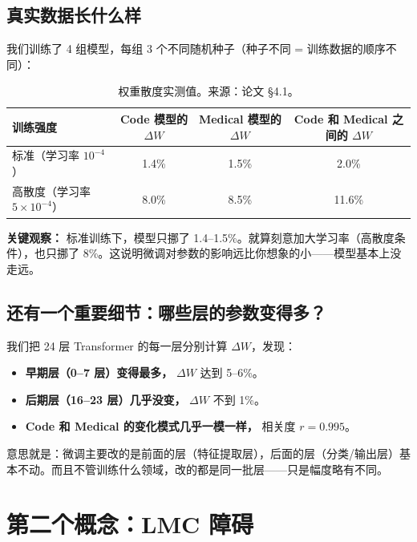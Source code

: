 \documentclass[12pt,a4paper]{ctexart}
\begin{document}
\subsection*{真实数据长什么样}

我们训练了 4 组模型，每组 3 个不同随机种子（种子不同 = 训练数据的顺序不同）：

\begin{table}[H]
\centering
\begin{tabular}{lccc}
\toprule
\textbf{训练强度} & \textbf{Code 模型的 $\Delta W$} & \textbf{Medical 模型的 $\Delta W$} & \textbf{Code 和 Medical 之间的 $\Delta W$} \\
\midrule
标准（学习率 $10^{-4}$） & 1.4\% & 1.5\% & 2.0\% \\
高散度（学习率 $5\times10^{-4}$） & 8.0\% & 8.5\% & 11.6\% \\
\bottomrule
\end{tabular}
\caption{权重散度实测值。来源：论文 \S4.1。}
\end{table}

\textbf{关键观察：} 标准训练下，模型只挪了 1.4--1.5\%。就算刻意加大学习率（高散度条件），也只挪了 8\%。这说明微调对参数的影响远比你想象的小——模型基本上没走远。

\subsection*{还有一个重要细节：哪些层的参数变得多？}

我们把 24 层 Transformer 的每一层分别计算 $\Delta W$，发现：

\begin{itemize}
  \item \textbf{早期层（0--7 层）变得最多，} $\Delta W$ 达到 5--6\%。
  \item \textbf{后期层（16--23 层）几乎没变，} $\Delta W$ 不到 1\%。
  \item \textbf{Code 和 Medical 的变化模式几乎一模一样，} 相关度 $r = 0.995$。
\end{itemize}

意思就是：微调主要改的是前面的层（特征提取层），后面的层（分类/输出层）基本不动。而且不管训练什么领域，改的都是同一批层——只是幅度略有不同。

\section{第二个概念：LMC 障碍}
\end{document}
